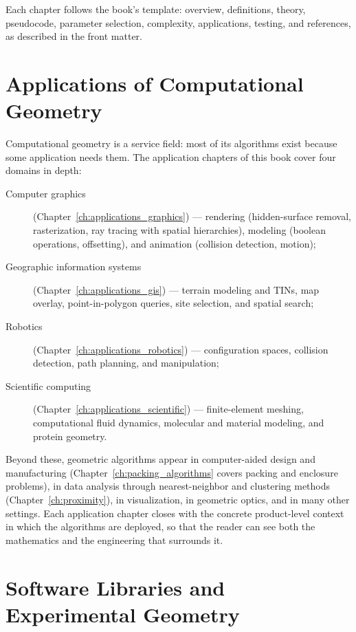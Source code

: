 Each chapter follows the book's template: overview, definitions, theory,
pseudocode, parameter selection, complexity, applications, testing, and
references, as described in the front matter.


\section{Applications of Computational Geometry}
\label{sec:intro_applications}

Computational geometry is a service field: most of its algorithms exist
because some application needs them. The application chapters of this book
cover four domains in depth:

\begin{description}
  \item[Computer graphics] (Chapter~\ref{ch:applications_graphics}) ---
    rendering (hidden-surface removal, rasterization, ray tracing with
    spatial hierarchies), modeling (boolean operations, offsetting), and
    animation (collision detection, motion);
  \item[Geographic information systems] (Chapter~\ref{ch:applications_gis}) ---
    terrain modeling and TINs, map overlay, point-in-polygon queries,
    site selection, and spatial search;
  \item[Robotics] (Chapter~\ref{ch:applications_robotics}) ---
    configuration spaces, collision detection, path planning, and
    manipulation;
  \item[Scientific computing] (Chapter~\ref{ch:applications_scientific}) ---
    finite-element meshing, computational fluid dynamics, molecular and
    material modeling, and protein geometry.
\end{description}

Beyond these, geometric algorithms appear in computer-aided design and
manufacturing (Chapter~\ref{ch:packing_algorithms} covers packing and
enclosure problems), in data analysis through nearest-neighbor and
clustering methods (Chapter~\ref{ch:proximity}), in visualization, in
geometric optics, and in many other settings. Each application chapter
closes with the concrete product-level context in which the algorithms are
deployed, so that the reader can see both the mathematics and the
engineering that surrounds it.


\section{Software Libraries and Experimental Geometry}
\label{sec:intro_software}

